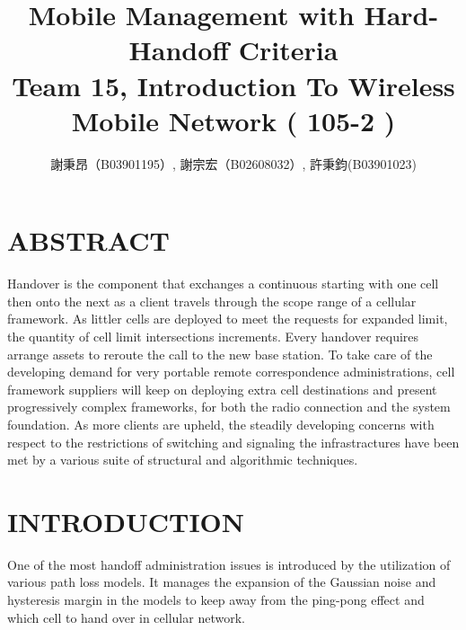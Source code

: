 \documentclass[a4paper]{IEEEtran}
\title{%
    Mobile Management with Hard-Handoff Criteria \\{\large Team 15, Introduction To Wireless Mobile Network ( 105-2 )}
}
\author{謝秉昂（B03901195）, 謝宗宏（B02608032）, 許秉鈞(B03901023)}
\begin{document}
\maketitle
\section{\textbf{ABSTRACT}}
Handover is the component that exchanges a continuous starting with one cell then onto the next as a client travels through the scope range of a cellular framework. As littler cells are deployed to meet the requests for expanded limit, the quantity of cell limit intersections increments. Every handover requires arrange assets to reroute the call to the new base station. To take care of the developing demand for very portable remote correspondence administrations, cell framework suppliers will keep on deploying extra cell destinations and present progressively complex frameworks, for both the radio connection and the system foundation. As more clients are upheld, the steadily developing concerns with respect to the restrictions of switching and signaling the infrastractures have been met by a various suite of structural and algorithmic techniques.



\section{\textbf{INTRODUCTION}}
One of the most handoff administration issues is introduced by the utilization of various path loss models. It manages the expansion of the Gaussian noise and hysteresis margin in the models to keep away from the ping-pong effect and which cell to hand over in cellular network.
\end{document}
